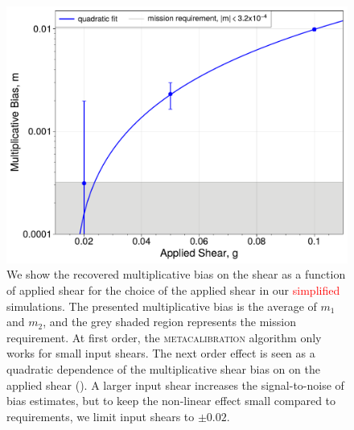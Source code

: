 \documentclass[fleqn,usenatbib]{mnras}
\begin{document}
\begin{figure}
	\includegraphics[width=\columnwidth]{metacal_bias_shear_pplt.pdf}
    \caption{We show the recovered multiplicative bias on the shear as a function of applied shear for the choice of the applied shear in our \textcolor{red}{simplified} simulations. The presented multiplicative bias is the average of $m_{1}$ and $m_{2}$, and the grey shaded region represents the mission requirement. At first order, the \textsc{metacalibration} algorithm only works for small input shears. The next order effect is seen as a quadratic dependence of the multiplicative shear bias on on the applied shear (\citealt{2017ApJ...841...24S}). A larger input shear increases the signal-to-noise of bias estimates, but to keep the non-linear effect small compared to requirements, we limit input shears to $\pm 0.02$. }
    \label{fig:metacal_shear_linear}
\end{figure}
\end{document}
